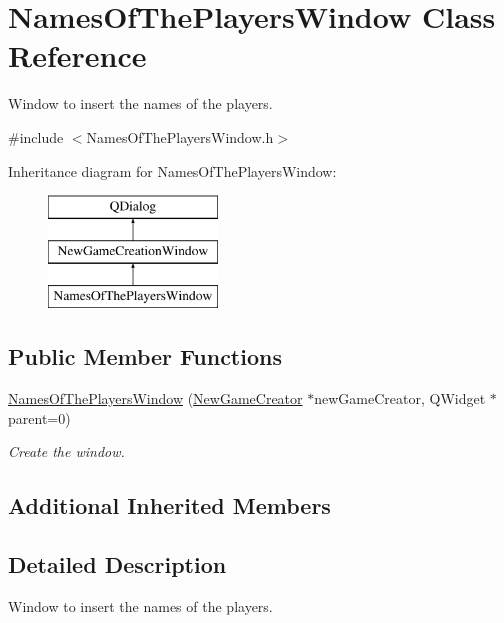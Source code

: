 \hypertarget{classNamesOfThePlayersWindow}{}\section{Names\+Of\+The\+Players\+Window Class Reference}
\label{classNamesOfThePlayersWindow}


Window to insert the names of the players.  




{\ttfamily \#include $<$Names\+Of\+The\+Players\+Window.\+h$>$}

Inheritance diagram for Names\+Of\+The\+Players\+Window\+:\begin{figure}[H]
\begin{center}
\leavevmode
\includegraphics[height=3.000000cm]{classNamesOfThePlayersWindow}
\end{center}
\end{figure}
\subsection*{Public Member Functions}
\begin{DoxyCompactItemize}
\item 
\hyperlink{classNamesOfThePlayersWindow_a199b485baab3f42c072a33e845cd35cf}{Names\+Of\+The\+Players\+Window} (\hyperlink{classNewGameCreator}{New\+Game\+Creator} $\ast$new\+Game\+Creator, Q\+Widget $\ast$parent=0)
\begin{DoxyCompactList}\small\item\em Create the window. \end{DoxyCompactList}\end{DoxyCompactItemize}
\subsection*{Additional Inherited Members}


\subsection{Detailed Description}
Window to insert the names of the players. 

